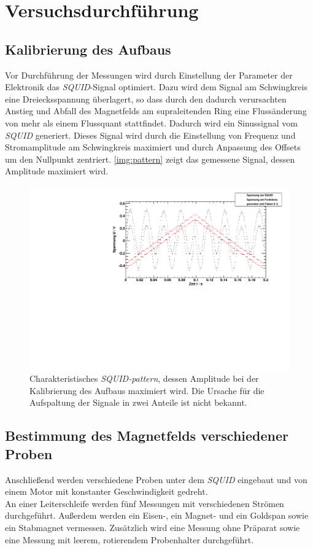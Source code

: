 \section{Versuchsdurchführung}

\subsection*{Kalibrierung des Aufbaus}

Vor Durchführung der Messungen wird durch Einstellung der Parameter der Elektronik das \emph{SQUID}-Signal
optimiert. Dazu wird dem Signal am Schwingkreis eine Dreiecksspannung überlagert,
so dass durch den dadurch verursachten Anstieg und Abfall des Magnetfelds am supraleitenden Ring
eine Flussänderung von mehr als einem Flussquant stattfindet. Dadurch wird ein Sinussignal vom \emph{SQUID}
generiert. Dieses Signal wird durch die Einstellung von Frequenz und Stromamplitude am Schwingkreis
maximiert und durch Anpassung des Offsets um den Nullpunkt zentriert.
\autoref{img:pattern} zeigt das gemessene Signal, dessen Amplitude maximiert wird.

\begin{figure}[H]
\begin{center}
  \includegraphics[width=\textwidth]{../img/pattern.pdf}
  \caption{Charakteristisches \emph{SQUID-pattern}, dessen Amplitude bei der Kalibrierung des Aufbaus
  maximiert wird. Die Ursache für die Aufspaltung der Signale in zwei Anteile ist nicht bekannt.}
  \label{img:pattern}
\end{center}
\end{figure}


\subsection*{Bestimmung des Magnetfelds verschiedener Proben}
Anschließend werden verschiedene Proben unter dem \emph{SQUID} eingebaut und von einem Motor
mit konstanter Geschwindigkeit gedreht.\\
An einer Leiterschleife werden fünf Messungen mit verschiedenen Strömen durchgeführt.
Außerdem werden ein Eisen-, ein Magnet- und ein Goldspan sowie ein Stabmagnet vermessen.
Zusätzlich wird eine Messung ohne Präparat sowie eine Messung mit leerem, rotierendem Probenhalter durchgeführt.



